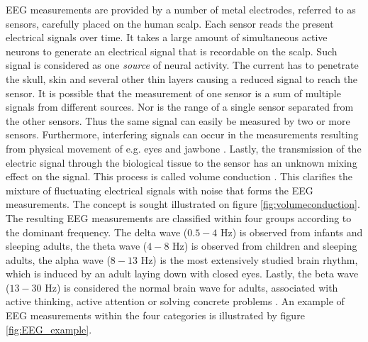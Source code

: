 EEG measurements are provided by a number of metal electrodes, referred to as sensors, carefully placed on the human scalp. 
Each sensor reads the present electrical signals over time.
It takes a large amount of simultaneous active neurons to generate an electrical signal that is recordable on the scalp. Such signal is considered as one \textit{ source} of neural activity. 
The current has to penetrate the skull, skin and several other thin layers causing a reduced signal to reach the sensor.
It is possible that the measurement of one sensor is a sum of multiple signals from different sources.
Nor is the range of a single sensor separated from the other sensors. Thus the same signal can easily be measured by two or more sensors.
Furthermore, interfering signals can occur in the measurements resulting from physical movement of e.g. eyes and jawbone \cite{fundamentalEEG}. 
Lastly, the transmission of the electric signal through the biological tissue to the sensor has an unknown mixing effect on the signal. This process is called volume conduction \cite[p. 68]{EEGsignalprocessing} \cite{Van2019}.
This clarifies the mixture of fluctuating electrical signals with noise that forms the EEG measurements. 
The concept is sought illustrated on figure \ref{fig:volumeconduction}. 
The resulting EEG measurements are classified within four groups according to the dominant frequency. 
The delta wave ($0.5-4$ Hz) is observed from infants and sleeping adults, the theta wave ($4-8$ Hz) is observed from children and sleeping adults, the alpha wave ($8-13$ Hz) is the most extensively studied brain rhythm, which is induced by an adult laying down with closed eyes. 
Lastly, the beta wave ($13-30$ Hz) is considered the normal brain wave for adults, associated with active thinking, active attention or solving concrete problems \cite[p. 11]{EEGsignalprocessing}. 
An example of EEG measurements within the four categories is illustrated by figure \ref{fig:EEG_example}.        
